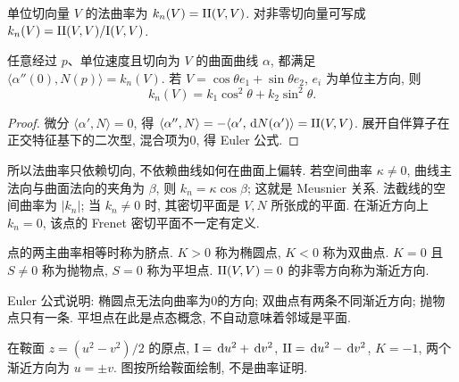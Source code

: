 \begin{definition}
单位切向量 $V$ 的法曲率为 $k_n(V)=\mathrm{II}(V,V)$. 对非零切向量可写成 $k_n(V)=\mathrm{II}(V,V)/\mathrm{I}(V,V)$.
\end{definition}
\begin{proposition}\label{prop:normal-curvature}
任意经过 $p$、单位速度且切向为 $V$ 的曲面曲线 $\alpha$, 都满足 $\langle\alpha''(0),N(p)\rangle=k_n(V)$. 若 $V=\cos\theta e_1+\sin\theta e_2$, $e_i$ 为单位主方向, 则
\begin{equation}\label{eq:euler}
 k_n(V)=k_1\cos^2\theta+k_2\sin^2\theta.
\end{equation}
\end{proposition}
\begin{proof}
微分 $\langle\alpha',N\rangle=0$, 得 $\langle\alpha'',N\rangle=-\langle\alpha',\,\mathrm d N(\alpha')\rangle=\mathrm{II}(V,V)$. 展开自伴算子在正交特征基下的二次型, 混合项为0, 得 Euler 公式.
\end{proof}
所以法曲率只依赖切向, 不依赖曲线如何在曲面上偏转. 若空间曲率 $\kappa\ne0$, 曲线主法向与曲面法向的夹角为 $\beta$, 则 $k_n=\kappa\cos\beta$; 这就是 Meusnier 关系. 法截线的空间曲率为 $|k_n|$; 当 $k_n\ne0$ 时, 其密切平面是 $V,N$ 所张成的平面. 在渐近方向上 $k_n=0$, 该点的 Frenet 密切平面不一定有定义.
\begin{definition}
点的两主曲率相等时称为脐点. $K>0$ 称为椭圆点, $K<0$ 称为双曲点. $K=0$ 且 $S\ne0$ 称为抛物点, $S=0$ 称为平坦点. $\mathrm{II}(V,V)=0$ 的非零方向称为渐近方向.
\end{definition}
Euler 公式说明: 椭圆点无法向曲率为0的方向; 双曲点有两条不同渐近方向; 抛物点只有一条. 平坦点在此是点态概念, 不自动意味着邻域是平面.
\begin{center}
\end{center}
在鞍面 $z=(u^2-v^2)/2$ 的原点, $\mathrm{I}=\,\mathrm d u^2+\,\mathrm d v^2$, $\mathrm{II}=\,\mathrm d u^2-\,\mathrm d v^2$, $K=-1$, 两个渐近方向为 $u=\pm v$. 图按所给鞍面绘制, 不是曲率证明.
